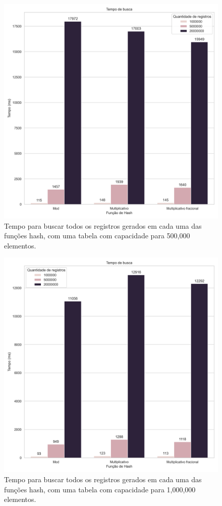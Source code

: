 \documentclass[12pt]{article}
\begin{document}
\newpage
\begin{figure}[ht]
\centering
\includegraphics[width=\textwidth,height=\textheight,keepaspectratio]{figures/LookupRuntime_500000.png}
\caption{Tempo para buscar todos os registros gerados em cada uma das funções hash, com uma tabela com capacidade para 500,000 elementos.}
\end{figure}

\newpage
\begin{figure}[ht]
\centering
\includegraphics[width=\textwidth,height=\textheight,keepaspectratio]{figures/LookupRuntime_1000000.png}
\caption{Tempo para buscar todos os registros gerados em cada uma das funções hash, com uma tabela com capacidade para 1,000,000 elementos.}
\end{figure}
\end{document}
